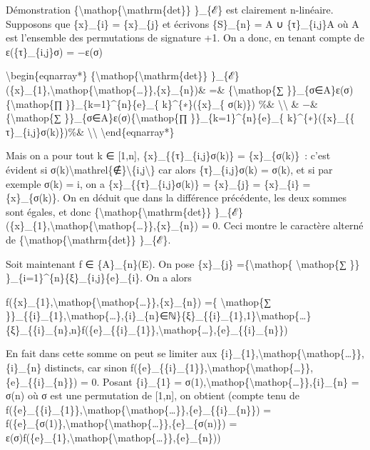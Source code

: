 \documentclass[]{article}
\begin{document}
Démonstration \{\textbackslash{}mathop\{\textbackslash{}mathrm\{det\}\}
\}\_\{ℰ\} est clairement n-linéaire. Supposons que \{x\}\_\{i\} =
\{x\}\_\{j\} et écrivons \{S\}\_\{n\} = A ∪ \{τ\}\_\{i,j\}A où A est
l'ensemble des permutations de signature +1. On a donc, en tenant compte
de ε(\{τ\}\_\{i,j\}σ) = −ε(σ)

\textbackslash{}begin\{eqnarray*\}
\{\textbackslash{}mathop\{\textbackslash{}mathrm\{det\}\}
\}\_\{ℰ\}(\{x\}\_\{1\},\textbackslash{}mathop\{\textbackslash{}mathop\{\ldots{}\}\},\{x\}\_\{n\})\&
=\& \{\textbackslash{}mathop\{∑
\}\}\_\{σ∈A\}ε(σ)\{\textbackslash{}mathop\{∏
\}\}\_\{k=1\}\^{}\{n\}\{e\}\_\{ k\}\^{}\{∗\}(\{x\}\_\{ σ(k)\}) \%\&
\textbackslash{}\textbackslash{} \& −\& \{\textbackslash{}mathop\{∑
\}\}\_\{σ∈A\}ε(σ)\{\textbackslash{}mathop\{∏
\}\}\_\{k=1\}\^{}\{n\}\{e\}\_\{ k\}\^{}\{∗\}(\{x\}\_\{\{
τ\}\_\{i,j\}σ(k)\})\%\& \textbackslash{}\textbackslash{}
\textbackslash{}end\{eqnarray*\}

Mais on a pour tout k ∈ {[}1,n{]}, \{x\}\_\{\{τ\}\_\{i,j\}σ(k)\} =
\{x\}\_\{σ(k)\}~: c'est évident si
σ(k)\textbackslash{}mathrel\{∉\}\textbackslash{}\{i,j\textbackslash{}\}
car alors \{τ\}\_\{i,j\}σ(k) = σ(k), et si par exemple σ(k) = i, on a
\{x\}\_\{\{τ\}\_\{i,j\}σ(k)\} = \{x\}\_\{j\} = \{x\}\_\{i\} =
\{x\}\_\{σ(k)\}. On en déduit que dans la différence précédente, les
deux sommes sont égales, et donc
\{\textbackslash{}mathop\{\textbackslash{}mathrm\{det\}\}
\}\_\{ℰ\}(\{x\}\_\{1\},\textbackslash{}mathop\{\textbackslash{}mathop\{\ldots{}\}\},\{x\}\_\{n\})
= 0. Ceci montre le caractère alterné de
\{\textbackslash{}mathop\{\textbackslash{}mathrm\{det\}\} \}\_\{ℰ\}.

Soit maintenant f ∈ \{A\}\_\{n\}(E). On pose \{x\}\_\{j\}
=\{\textbackslash{}mathop\{ \textbackslash{}mathop\{∑ \}\}
\}\_\{i=1\}\^{}\{n\}\{ξ\}\_\{i,j\}\{e\}\_\{i\}. On a alors

f(\{x\}\_\{1\},\textbackslash{}mathop\{\textbackslash{}mathop\{\ldots{}\}\},\{x\}\_\{n\})
=\{ \textbackslash{}mathop\{∑
\}\}\_\{\{i\}\_\{1\},\textbackslash{}mathop\{\ldots{}\},\{i\}\_\{n\}∈ℕ\}\{ξ\}\_\{\{i\}\_\{1\},1\}\textbackslash{}mathop\{\ldots{}\}\{ξ\}\_\{\{i\}\_\{n\},n\}f(\{e\}\_\{\{i\}\_\{1\}\},\textbackslash{}mathop\{\ldots{}\},\{e\}\_\{\{i\}\_\{n\}\})

En fait dans cette somme on peut se limiter aux
\{i\}\_\{1\},\textbackslash{}mathop\{\textbackslash{}mathop\{\ldots{}\}\},\{i\}\_\{n\}
distincts, car sinon
f(\{e\}\_\{\{i\}\_\{1\}\},\textbackslash{}mathop\{\textbackslash{}mathop\{\ldots{}\}\},\{e\}\_\{\{i\}\_\{n\}\})
= 0. Posant \{i\}\_\{1\} =
σ(1),\textbackslash{}mathop\{\textbackslash{}mathop\{\ldots{}\}\},\{i\}\_\{n\}
= σ(n) où σ est une permutation de {[}1,n{]}, on obtient (compte tenu de
f(\{e\}\_\{\{i\}\_\{1\}\},\textbackslash{}mathop\{\textbackslash{}mathop\{\ldots{}\}\},\{e\}\_\{\{i\}\_\{n\}\})
=
f(\{e\}\_\{σ(1)\},\textbackslash{}mathop\{\textbackslash{}mathop\{\ldots{}\}\},\{e\}\_\{σ(n)\})
=
ε(σ)f(\{e\}\_\{1\},\textbackslash{}mathop\{\textbackslash{}mathop\{\ldots{}\}\},\{e\}\_\{n\}))
\end{document}
